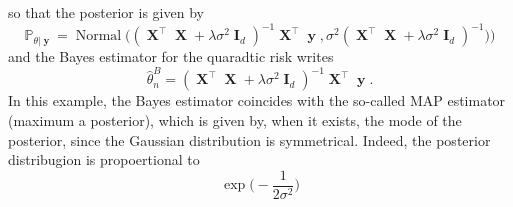 \documentclass[
	fontsize=11pt, %
	twoside=false, %
	numbers=noenddot, %
]{kaobook}
\DeclareMathOperator{\bI}{{\boldsymbol I}}
\DeclareMathOperator{\bX}{{\boldsymbol X}}
\DeclareMathOperator{\by}{{\boldsymbol y}}
\DeclareMathOperator{\nor}{Normal}
\renewcommand{\P}{\mathbb P}
\newcommand{\wh}{\widehat}
\begin{document}
so that the posterior is given by
\begin{equation*}
	\P_{\theta | \by} = \nor \Big( (\bX^\top \bX  + \lambda \sigma^2 \bI_d)^{-1} \bX^\top \by,
	\sigma^2 (\bX^\top \bX + \lambda \sigma^2 \bI_d)^{-1} \Big)
	 \Big)
\end{equation*}
and the Bayes estimator for the quaradtic risk writes
\begin{equation*}
	\wh \theta_n^B = (\bX^\top \bX  + \lambda \sigma^2 \bI_d)^{-1} \bX^\top \by.
\end{equation*}
In this example, the Bayes estimator coincides with the so-called MAP estimator (maximum a posterior), which is given by, when it exists, the mode of the posterior, since the Gaussian distribution is symmetrical.
Indeed, the posterior distribugion is propoertional to
\begin{equation*}
	\exp \Big( -\frac{1}{2 \sigma^2} \Big)
\end{equation*}







\printbibliography[heading=bibintoc, title=Bibliography] %




\end{document}
